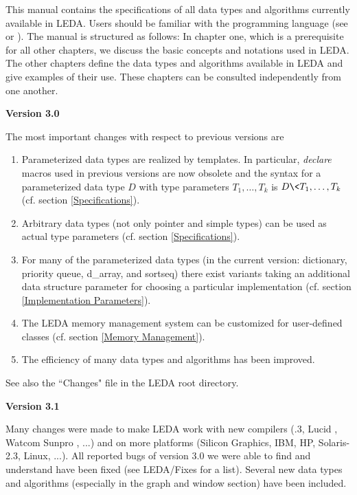 This manual contains the specifications of all data types and algorithms 
currently available in LEDA. Users should be familiar with the \CC 
programming language (see \cite{S91} or \cite{Li89}).  The manual 
is structured as follows: In chapter one, which is a prerequisite for all
other chapters, we discuss the basic concepts and notations used in LEDA.
The other chapters define the data types and algorithms available in
LEDA and give examples of their use. These chapters can be consulted
independently from one another.

\bigskip
\bigskip
{\large\bf Version 3.0}

The most important changes with respect to previous versions are

\begin{enumerate}
\item 
Parameterized data types are realized by \CC templates. In particular, 
{\it declare} macros used in previous versions are now obsolete and the 
syntax for a parameterized data type $D$ with type parameters $T_1,\dots,T_k$ 
is $D\<T_1,\dots,T_k\>$ (cf. section \ref{Specifications}). 

\item
Arbitrary data types (not only pointer and simple types) can be used as
actual type parameters (cf. section \ref{Specifications}). 

\item
For many of the parameterized data types (in the current version: dictionary, 
priority queue, d\_array, and sortseq) there exist variants taking an additional
data structure parameter for choosing a particular implementation 
(cf. section \ref{Implementation Parameters}).

\item
The LEDA memory management system can be customized for user-defined classes
(cf. section \ref{Memory Management}).

\item
The efficiency of many data types and algorithms has been improved.
\end{enumerate}

See also the ``Changes" file in the LEDA root directory.


\newpage
{\large\bf Version 3.1}

Many changes were made to make LEDA work with new compilers (.3,
Lucid \CC, Watcom \CC Sunpro \CC, ...) and on more platforms (Silicon 
Graphics, IBM, HP, Solaris-2.3, Linux, ...). All reported bugs of version
3.0 we were able to find and understand have been fixed (see LEDA/Fixes
for a list). Several new data types and algorithms (especially in the graph 
and window section) have been included.



